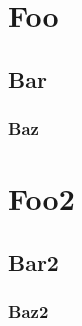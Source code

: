 

\newcommand{\MyInstitution}{Macquarie University}
\newcommand{\MyTitle}{MATH135 TEMPLATE}
\newcommand{\MySubtitle}{A very unofficial textbook.}
\newcommand{\MyName}{Adam Carmichael}
\newcommand{\MySubjects}{MATH, MATH135, 1st Year Calculus, 1st Year Algebra,
Algebra-I, Calculus-I}
\newcommand{\MyKeywords}{\MySubjects}





\chapter{Foo}
\section{Bar}
\subsection{Baz}

\chapter{Foo2}
\section{Bar2}
\subsection{Baz2}

